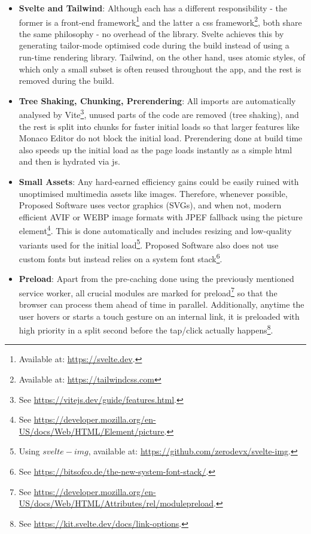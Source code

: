 \begin{itemize}
    \item \textbf{Svelte and Tailwind}: Although each has a different responsibility - the former is a front-end framework\footnote{Available at: \url{https://svelte.dev}.} and the latter a \gls{css} framework\footnote{Available at: \url{https://tailwindcss.com}}, both share the same philosophy - no overhead of the library. Svelte achieves this by generating tailor-mode optimised code during the build instead of using a run-time rendering library. Tailwind, on the other hand, uses atomic styles, of which only a small subset is often reused throughout the app, and the rest is removed during the build.
    \item \textbf{Tree Shaking, Chunking, Prerendering}: All imports are automatically analysed by Vite\footnote{See \url{https://vitejs.dev/guide/features.html}.}, unused parts of the code are removed (tree shaking), and the rest is split into chunks for faster initial loads so that larger features like Monaco Editor do not block the initial load. Prerendering done at build time also speeds up the initial load as the page loads instantly as a simple \gls{html} and then is hydrated via \gls{js}.
    \item \textbf{Small Assets}: Any hard-earned efficiency gains could be easily ruined with unoptimised multimedia assets like images. Therefore, whenever possible, Proposed Software uses vector graphics (SVGs), and when not, modern efficient AVIF or WEBP image formats with JPEF fallback using the picture element\footnote{See \url{https://developer.mozilla.org/en-US/docs/Web/HTML/Element/picture}.}. This is done automatically and includes resizing and low-quality variants used for the initial load\footnote{Using $svelte-img$, available at: \url{https://github.com/zerodevx/svelte-img}.}. Proposed Software also does not use custom fonts but instead relies on a system font stack\footnote{See \url{https://bitsofco.de/the-new-system-font-stack/}.}.
    \item \textbf{Preload}: Apart from the pre-caching done using the previously mentioned service worker, all crucial modules are marked for preload\footnote{See \url{https://developer.mozilla.org/en-US/docs/Web/HTML/Attributes/rel/modulepreload}.} so that the browser can process them ahead of time in parallel. Additionally, anytime the user hovers or starts a touch gesture on an internal link, it is preloaded with high priority in a split second before the tap/click actually happens\footnote{See \url{https://kit.svelte.dev/docs/link-options}.}.
\end{itemize}

